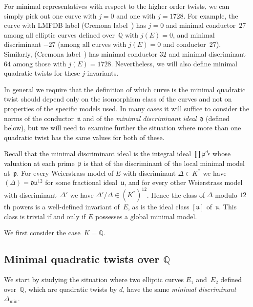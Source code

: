 \documentclass{article}
\theoremstyle{remark}
\def\Q{{\mathbb Q}}
\def\d{{\mathfrak d}}
\def\n{{\mathfrak n}}
\def\p{{\mathfrak p}}
\def\u{{\mathfrak u}}
\newcommand{\lmfdbecLMFDB}[3]{\href{http://www.lmfdb.org/EllipticCurve/Q/#1.#2#3}{{\text{\rm#1.#2#3}}}}
\newcommand{\lmfdbecCremona}[3]{\href{http://www.lmfdb.org/EllipticCurve/Q/#1#2#3}{{\text{\rm#1#2#3}}}}
\begin{document}
For minimal representatives with respect to the higher order twists,
we can simply pick out one curve with $j=0$ and one with $j=1728$. For
example, the curve with LMFDB label \lmfdbecLMFDB{27}{a}{4} (Cremona
label~\lmfdbecCremona{27}{a}{3}) has $j=0$ and minimal conductor~$27$
among all elliptic curves defined over~$\Q$ with $j(E)=0$, and minimal
discriminant $-27$ (among all curves with $j(E)=0$ and
conductor~$27$).  Similarly, \lmfdbecLMFDB{32}{a}{3} (Cremona
label~\lmfdbecCremona{32}{a}{2}) has minimal conductor $32$ and
minimal discriminant~$64$ among those with $j(E)=1728$.  Nevertheless,
we will also define minimal quadratic twists for these $j$-invariants.

In general we require that the definition of which curve is the
minimal quadratic twist should depend only on the isomorphism class of
the curves and not on properties of the specific models used.  In many
cases it will suffice to consider the norms of the conductor~$\n$ and
of the \textit{minimal discriminant ideal}~$\d$ (defined below), but
we will need to examine further the situation where more than one
quadratic twist has the same values for both of these.

Recall that the minimal discriminant ideal is the integral ideal
$\prod\p^{d_{\p}}$ whose valuation at each prime~$\p$ is that of the
discriminant of the local minimal model at~$\p$.  For every
Weierstrass model of $E$ with discriminant $\Delta\in K^*$ we have
$(\Delta)=\d\u^{12}$ for some fractional ideal~$\u$, and for every
other Weierstrass model with discriminant~$\Delta'$ we have
$\Delta'/\Delta\in (K^*)^{12}$.  Hence the class of $\Delta$ modulo
$12$th powers is a well-defined invariant of~$E$, as is the ideal
class $[\u]$ of~$\u$.  This class is trivial if and only if $E$
possesses a global minimal model.

We first consider the case~$K=\Q$.

\subsection{Minimal quadratic twists over \texorpdfstring{$\Q$}{\textbf Q}}

We start by studying the situation where two elliptic curves $E_1$
and~$E_2$ defined over~$\Q$, which are quadratic twists by $d$, have
the same \textit{minimal discriminant}~$\Delta_{\text{min}}$.
\end{document}
